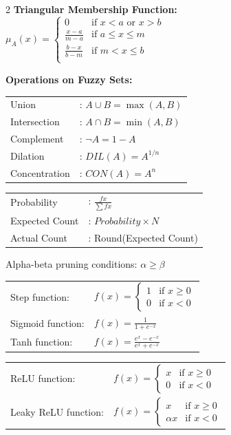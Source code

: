 \begin{multicols}{2}
\textbf{Triangular Membership Function:}\\[0.5em]
$\mu_A(x) =
\begin{cases} 0 & \text{if } x < a \text{ \ or \ } x > b \\
   \frac{x-a}{m-a} & \text{if } a \leq x \leq m \\[1em]
   \frac{b-x}{b-m} & \text{if } m < x \leq b \\
\end{cases}$

\textbf{Operations on Fuzzy Sets:}\\[0.5em]
\begin{tabular}{ll}
   Union &: $A \cup B = \max(A, B)$ \\
   Intersection &: $A \cap B = \min(A, B)$ \\
   Complement &: $\neg A = 1 - A$ \\
   Dilation &: $DIL(A) = A^{1/n}$ \\
   Concentration &: $CON(A) = A^n$ \\
\end{tabular}


\begin{tabular}{ll}
   Probability &: $\frac{fx}{\sum fx}$ \\
   Expected Count &: $Probability \times N$ \\
   Actual Count &: Round(Expected Count)
\end{tabular}

Alpha-beta pruning conditions: $\alpha \geq \beta$

\begin{tabular}{ll}
   Step function: & $f(x) = \begin{cases} 1 & \text{if } x \geq 0 \\ 0 & \text{if } x < 0 \end{cases}$ \\[0.5em]
   Sigmoid function: & $f(x) = \frac{1}{1 + e^{-x}}$ \\[0.5em]
   Tanh function: & $f(x) = \frac{e^x - e^{-x}}{e^x + e^{-x}}$
\end{tabular}

\begin{tabular}{ll}
   ReLU function: & $f(x) = \begin{cases} x & \text{if } x \geq 0 \\ 0 & \text{if } x < 0 \end{cases}$ \\[0.5em]
   Leaky ReLU function: & $f(x) = \begin{cases} x & \text{if } x \geq 0 \\ \alpha x & \text{if } x < 0 \end{cases}$ \\
\end{tabular}


\end{multicols}
